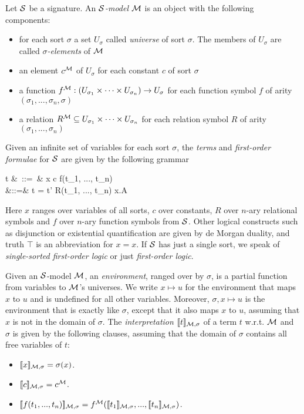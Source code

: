 Let $\mathcal{S}$ be a signature. An \emph{$\mathcal{S}$-model} $\mathcal{M}$ is an
object with the following components:
\begin{itemize}
\item
for each sort $\sigma$ a set
$U_{\sigma}$ called \emph{universe} of sort $\sigma$.  The members of
$U_{\sigma}$ are called \emph{$\sigma$-elements} of $\mathcal{M}$
\item
an element $c^{\mathcal{M}}$ of $U_{\sigma}$ for each constant $c$ of sort
$\sigma$
\item
a function $f^{\mathcal{M}} : (U_{\sigma_1}\times \dots \times
U_{\sigma_n}) \rightarrow U_{\sigma}$ for each function symbol $f$ of
arity $(\sigma_1, ..., \sigma_n, \sigma)$
\item
a relation $R^{\mathcal{M}}
\subseteq U_{\sigma_1}\times \dots \times U_{\sigma_n}$ for each
relation symbol $R$ of arity $(\sigma_1, ..., \sigma_n)$
\end{itemize}
Given an infinite set of variables for each sort $\sigma$, the
\emph{terms} and \emph{first-order formulae} for $\mathcal{S}$ are given by
the following grammar
\begin{GRAMMAR}
  t &\ ::=\ & x \VERTICAL c \VERTICAL f(t_1, ..., t_n) \\[1mm]
  \phi &::=& t = t' \VERTICAL R(t_1, ..., t_n) \VERTICAL \neg \phi \VERTICAL \phi \AND \psi \VERTICAL \forall x.A
\end{GRAMMAR}

\NI Here $x$ ranges over variables of all sorts, $c$ over constants,
$R$ over $n$-ary relational symbols and $f$ over $n$-ary function
symbols from $\mathcal{S}$.  Other logical constructs such as disjunction or
existential quantification are given by de Morgan duality, and truth
$\top$ is an abbreviation for $x = x$. If $\mathcal{S}$ has just a single
sort, we speak of \emph{single-sorted first-order logic} or just
\emph{first-order logic}. 

Given an $\mathcal{S}$-model $\mathcal{M}$, an \emph{environment}, ranged over by
$\sigma$, is a partial function from variables to $\mathcal{M}$'s
universes.  We write $x \mapsto u$ for the environment that maps $x$ to
$u$ and is undefined for all other variables. Moreover, $\sigma, x
\mapsto u$ is the environment that is exactly like $\sigma$, except
that it also maps $x$ to $u$, assuming that $x$ is not in the domain
of $\sigma$.  The \emph{interpretation} $\lbrack\!\lbrack t \rbrack\!\rbrack_{\mathcal{M}, \sigma}$
of a term $t$ w.r.t. $\mathcal{M}$ and $\sigma$ is given by the following
clauses, assuming that the domain of $\sigma$ contains all free
variables of $t$:
\begin{itemize}

\item $\lbrack\!\lbrack x \rbrack\!\rbrack_{\mathcal{M}, \sigma} = \sigma(x)$.
\item $\lbrack\!\lbrack c \rbrack\!\rbrack_{\mathcal{M}, \sigma} = c^{\mathcal{M}}$.
\item $\lbrack\!\lbrack f(t_1, ..., t_n) \rbrack\!\rbrack_{\mathcal{M}, \sigma} =
  f^{\mathcal{M}}(\lbrack\!\lbrack t_1 \rbrack\!\rbrack_{\mathcal{M}, \sigma}, ..., \lbrack\!\lbrack t_n \rbrack\!\rbrack_{\mathcal{M},
    \sigma})$.

\end{itemize}

